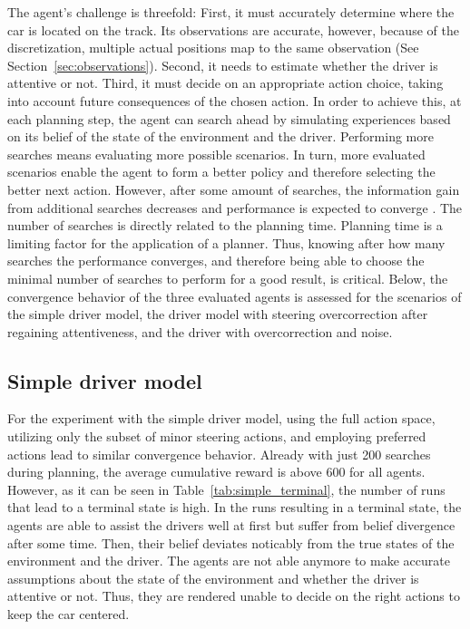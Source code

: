 The agent's challenge is threefold: First, it must accurately determine where the car is located on the track. Its observations are accurate, however, because of the discretization, multiple actual positions map to the same observation (See Section~\ref{sec:observations}). Second, it needs to estimate whether the driver is attentive or not. Third, it must decide on an appropriate action choice, taking into account future consequences of the chosen action. In order to achieve this, at each planning step, the agent can search ahead by simulating experiences based on its belief of the state of the environment and the driver. Performing more searches means evaluating more possible scenarios. In turn, more evaluated scenarios enable the agent to form a better policy and therefore selecting the better next action. However, after some amount of searches, the information gain from additional searches decreases and performance is expected to converge \parencite{pomcp}. The number of searches is directly related to the planning time. Planning time is a limiting factor for the application of a planner. Thus, knowing after how many searches the performance converges, and therefore being able to choose the minimal number of searches to perform for a good result, is critical. Below, the convergence behavior of the three evaluated agents is assessed for the scenarios of the simple driver model, the driver model with steering overcorrection after regaining attentiveness, and the driver with overcorrection and noise.

\subsection{Simple driver model}

For the experiment with the simple driver model, using the full action space, utilizing only the subset of minor steering actions, and employing preferred actions lead to similar convergence behavior. Already with just 200 searches during planning, the average cumulative reward is above 600 for all agents. However, as it can be seen in Table~\ref{tab:simple_terminal}, the number of runs that lead to a terminal state is high. In the runs resulting in a terminal state, the agents are able to assist the drivers well at first but suffer from belief divergence after some time. Then, their belief deviates noticably from the true states of the environment and the driver. The agents are not able anymore to make accurate assumptions about the state of the environment and whether the driver is attentive or not. Thus, they are rendered unable to decide on the right actions to keep the car centered. 

